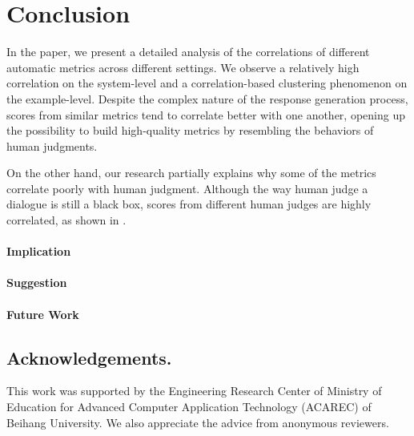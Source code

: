 \documentclass[runningheads]{llncs}
\begin{document}
    \section{Conclusion}
    In the paper, we present a detailed analysis of the correlations of different automatic metrics across different settings. We observe a relatively high correlation on the system-level and a correlation-based clustering phenomenon on the example-level. Despite the complex nature of the response generation process, scores from similar metrics tend to correlate better with one another, opening up the possibility to build high-quality metrics by resembling the behaviors of human judgments.

    On the other hand, our research partially explains why some of the metrics correlate poorly with human judgment. Although the way human judge a dialogue is still a black box, scores from different human judges are highly correlated, as shown in \cite{HowNot}.

    \paragraph{Implication}
    \paragraph{Suggestion}

    \paragraph{Future Work}


    \subsection*{Acknowledgements.}
    This work was supported by the Engineering Research Center of Ministry of Education for Advanced Computer Application Technology (ACAREC) of Beihang University. We also appreciate the advice from anonymous reviewers.

    
    
\end{document}
